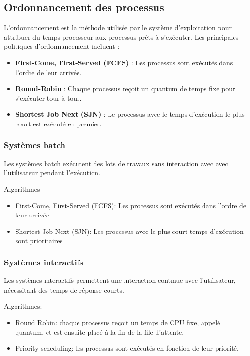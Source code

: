 \subsection{Ordonnancement des processus}
L'ordonnancement est la méthode utilisée par le système d'exploitation pour attribuer du temps processeur aux processus prêts à s'exécuter. 
Les principales politiques d'ordonnancement incluent :
\begin{itemize}
    \item \textbf{First-Come, First-Served (FCFS)} : Les processus sont exécutés dans l'ordre de leur arrivée.
    \item \textbf{Round-Robin} : Chaque processus reçoit un quantum de temps fixe pour s'exécuter tour à tour.
    \item \textbf{Shortest Job Next (SJN)} : Le processus avec le temps d'exécution le plus court est exécuté en premier.
\end{itemize}

\subsubsection{Systèmes batch}

Les systèmes batch exécutent des lots de travaux sans interaction avec avec l'utilisateur pendant l'exécution.

Algorithmes
\begin{itemize}
    \item First-Come, First-Served (FCFS): Les processus sont exécutés dans l'ordre de leur arrivée.
    \item Shortest Job Next (SJN): Les processus avec le plus court temps d'exécution sont prioritaires
\end{itemize}
\subsubsection{Systèmes interactifs}

Les systèmes interactifs permettent une interaction continue avec l'utilisateur, nécessitant des temps de réponse courts.

Algorithmes:
\begin{itemize}
    \item Round Robin: chaque processus reçoit un temps de CPU fixe, appelé quantum, et est ensuite placé à la fin de la file d'attente.
    \item Priority scheduling: les processus sont exécutés en fonction de leur priorité.
\end{itemize}
